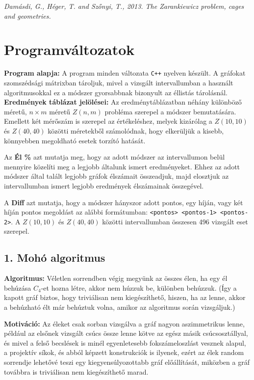 \documentclass[12pt,a4paper]{article}
\begin{document}
\noindent \textit{Damásdi, G., Héger, T. and Szőnyi, T., 2013. The Zarankiewicz problem, cages and geometries.} \cite{damasdi2013zarankiewicz}

\section*{Programváltozatok}

\textbf{Program alapja:} A program minden változata \texttt{C++} nyelven készült. A gráfokat szomszédsági mátrixban tároljuk, mivel a vizsgált intervallumban a használt algoritmusokkal ez a módszer gyorsabbnak bizonyult az éllistás tárolásnál.
\\[2mm]
\noindent \textbf{Eredmények táblázat jelölései:} 
Az eredménytáblázatban néhány különböző méretű, $n \times m$ méretű $Z(n, m)$ probléma szerepel a módszer bemutatására. Emellett két mérőszám is szerepel az értékeléshez, melyek kizárólag a $Z(10,10)$ és $Z(40,40)$ közötti méretekből számolódnak, hogy elkerüljük a kisebb, könnyebben megoldható esetek torzító hatását.

Az \textbf{Él \%} azt mutatja meg, hogy az adott módszer az intervallumon belül mennyire közelíti meg a legjobb általunk ismert eredményeket. Ehhez az adott módszer által talált legjobb gráfok élszámait összeadjuk, majd elosztjuk az intervallumban ismert legjobb eredmények élszámainak összegével.

A \textbf{Diff} azt mutatja, hogy a módszer hányszor adott pontos, egy híján, vagy két híján pontos megoldást az alábbi formátumban: \texttt{<pontos> <pontos-1> <pontos-2>}. A $Z(10,10)$ és $Z(40,40)$ közötti intervallumban összesen 496 vizsgált eset szerepel.




\subsection*{1. Mohó algoritmus}
\textbf{Algoritmus:} Véletlen sorrendben végig megyünk az összes élen, ha egy él behúzása $C_4$-et hozna létre, akkor nem húzzuk be, különben behúzzuk. (Így a kapott gráf biztos, hogy triviálisan nem kiegészíthető, hiszen, ha az lenne, akkor a behúzható élt már behúztuk volna, amikor az algoritmus során vizsgáljuk.)

\textbf{Motiváció:} Az éleket csak sorban vizsgálva a gráf nagyon aszimmetrikus lenne, például az elsőnek vizsgált csúcs össze lenne kötve az egész másik csúcsosztállyal, és mivel a felső becslések is minél egyenletesebb fokszámeloszlást vesznek alapul, a projektív síkok, és abból képzett konstrukciók is ilyenek, ezért az élek random sorrendje lehetővé teszi egy kiegyensúlyozottabb gráf előállítását, miközben a gráf továbbra is triviálisan nem kiegészíthető marad.
\end{document}
